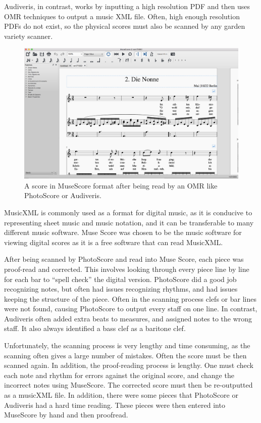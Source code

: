 \documentclass[12pt,twoside]{reedthesis}
\theoremstyle{definition}
\theoremstyle{definition}
\theoremstyle{definition}
\theoremstyle{remark}
\begin{document}
Audiveris, in contrast, works by inputting a high resolution PDF and
then uses OMR techniques to output a music XML file. Often, high enough
resolution PDFs do not exist, so the physical scores must also be
scanned by any garden variety scanner.
\begin{figure}[h]
\centering
\includegraphics[scale=.30]{images/museScore.png}
\caption{A score in MuseScore format after being read by an OMR like PhotoScore or Audiveris.}
\label{subd}
\end{figure}
MusicXML is commonly used as a format for digital music, as it is
conducive to representing sheet music and music notation, and it can be
transferable to many different music software. Muse Score was chosen to
be the music software for viewing digital scores as it is a free
software that can read MusicXML.

After being scanned by PhotoScore and read into Muse Score, each piece
was proof-read and corrected. This involves looking through every piece
line by line for each bar to ``spell check'' the digital version.
PhotoScore did a good job recognizing notes, but often had issues
recognizing rhythms, and had issues keeping the structure of the piece.
Often in the scanning process clefs or bar lines were not found, causing
PhotoScore to output every staff on one line. In contrast, Audiveris
often added extra beats to measures, and assigned notes to the wrong
staff. It also always identified a bass clef as a baritone clef.

Unfortunately, the scanning process is very lengthy and time consuming,
as the scanning often gives a large number of mistakes. Often the score
must be then scanned again. In addition, the proof-reading process is
lengthy. One must check each note and rhythm for errors against the
original score, and change the incorrect notes using MuseScore. The
corrected score must then be re-outputted as a musicXML file. In
addition, there were some pieces that PhotoScore or Audiveris had a hard
time reading. These pieces were then entered into MuseScore by hand and
then proofread.
\end{document}
